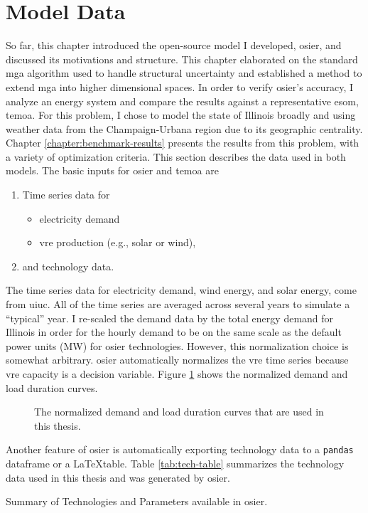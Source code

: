 \section{Model Data}
So far, this chapter introduced the open-source model I developed, \ac{osier},
and discussed its motivations and structure. This chapter elaborated on the
standard \ac{mga} algorithm used to handle structural uncertainty and
established a method to extend \ac{mga} into higher dimensional spaces. In order
to verify \ac{osier}'s accuracy, I analyze an energy system and compare the
results against a representative \ac{esom}, \ac{temoa}. For this problem, I
chose to model the state of Illinois broadly and using weather data from the
Champaign-Urbana region due to its geographic centrality. Chapter
\ref{chapter:benchmark-results} presents the results from this problem, with a
variety of optimization criteria. This section describes the data used in both
models. The basic inputs for \ac{osier} and \ac{temoa} are
\begin{enumerate}
    \item Time series data for
    \begin{itemize}
      \item electricity demand
      \item \ac{vre} production (e.g., solar or wind),
    \end{itemize} 
    \item and technology data.
\end{enumerate}
\noindent
The time series data for electricity demand, wind energy, and solar energy, come
from \ac{uiuc}. All of the time series are averaged across several years to
simulate a ``typical'' year. I re-scaled the demand data by the total energy
demand for Illinois in order for the hourly demand to be on the same scale as
the default power units (MW) for \ac{osier} technologies. However, this
normalization choice is somewhat arbitrary. \ac{osier} automatically normalizes
the \ac{vre} time series because \ac{vre} capacity is a decision variable.
Figure \ref{fig:normalized_ldc} shows the normalized demand and load duration
curves.


 \begin{figure}[h]
  \centering
  \resizebox{1\columnwidth}{!}{}
  \caption{The normalized demand and load duration curves that are used in this thesis.}
  \label{fig:normalized_ldc}
\end{figure}

\noindent
Another feature of \ac{osier} is automatically exporting technology data to a
\texttt{pandas} dataframe or a \LaTeX table. Table \ref{tab:tech-table}
summarizes the technology data used in this thesis and was generated by
\ac{osier}. 



\begin{sidewaystable}[!ht]
  \centering
  \caption{Summary of Technologies and Parameters available in \ac{osier}.}
  \label{tab:tech-table}
  \resizebox{\textheight}{!}{
  
  } %
\end{sidewaystable}